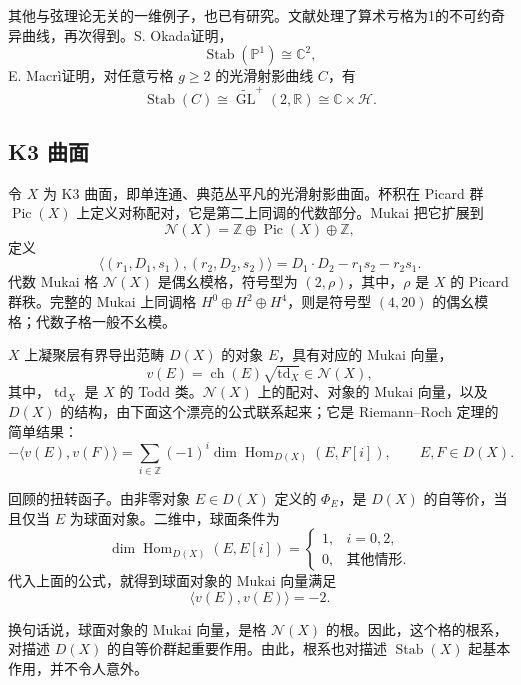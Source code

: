 其他与弦理论无关的一维例子，也已有研究。文献处理了算术亏格为1的不可约奇异曲线，再次得到。S. Okada证明，
\[
\operatorname{Stab}(\mathbb{P}^1)\cong\mathbb{C}^2,
\]
E. Macr\`i证明，对任意亏格 $g\ge2$ 的光滑射影曲线 $C$，有
\[
\operatorname{Stab}(C)\cong\widetilde{\operatorname{GL}}^{+}(2,\mathbb{R})
\cong\mathbb{C}\times\mathcal{H}.
\]

\subsection{K3 曲面}\label{sec:5.8.2}

令 $X$ 为 K3 曲面，即单连通、典范丛平凡的光滑射影曲面。杯积在 Picard 群 $\operatorname{Pic}(X)$ 上定义对称配对，它是第二上同调的代数部分。Mukai 把它扩展到
\[
\mathcal{N}(X)=\mathbb{Z}\oplus\operatorname{Pic}(X)\oplus\mathbb{Z},
\]
定义
\[
\langle(r_1,D_1,s_1),(r_2,D_2,s_2)\rangle
=D_1\cdot D_2-r_1s_2-r_2s_1.
\]
代数 Mukai 格 $\mathcal{N}(X)$ 是偶幺模格，符号型为 $(2,\rho)$，其中，$\rho$ 是 $X$ 的 Picard 群秩。完整的 Mukai 上同调格 $H^0\oplus H^2\oplus H^4$，则是符号型 $(4,20)$ 的偶幺模格；代数子格一般不幺模。

$X$ 上凝聚层有界导出范畴 $D(X)$ 的对象 $E$，具有对应的 Mukai 向量，
\[
v(E)=\operatorname{ch}(E)\sqrt{\operatorname{td}_X}\in\mathcal{N}(X),
\]
其中，$\operatorname{td}_X$ 是 $X$ 的 Todd 类。$\mathcal{N}(X)$ 上的配对、对象的 Mukai 向量，以及 $D(X)$ 的结构，由下面这个漂亮的公式联系起来；它是 Riemann--Roch 定理的简单结果：
\[
-\langle v(E),v(F)\rangle
=\sum_{i\in\mathbb{Z}}(-1)^i\dim\operatorname{Hom}_{D(X)}(E,F[i]),
\qquad E,F\in D(X).
\]

回顾的扭转函子。由非零对象 $E\in D(X)$ 定义的 $\Phi_E$，是 $D(X)$ 的自等价，当且仅当 $E$ 为球面对象。二维中，球面条件为
\[
\dim\operatorname{Hom}_{D(X)}(E,E[i])
=\begin{cases}
1,&i=0,2,\\
0,&\text{其他情形}.
\end{cases}
\]
代入上面的公式，就得到球面对象的 Mukai 向量满足
\[
\langle v(E),v(E)\rangle=-2.
\]

换句话说，球面对象的 Mukai 向量，是格 $\mathcal{N}(X)$ 的根。因此，这个格的根系，对描述 $D(X)$ 的自等价群起重要作用。由此，根系也对描述 $\operatorname{Stab}(X)$ 起基本作用，并不令人意外。

